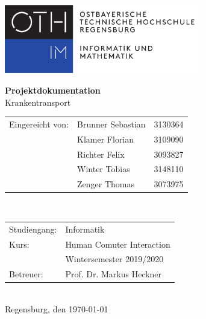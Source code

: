 \documentclass[a4paper, ngerman, 12pt]{scrartcl}
\begin{document}
\begin{titlepage}
\begin{center}
\begin{flushleft}
\includegraphics[height=30mm]{def/OTHR_FakIM_Logo}
\end{flushleft}
\vspace*{3cm}
{\Huge\textbf{Projektdokumentation}}\\
\vspace{1cm}
{\huge Krankentransport}\\
\end{center}
\vspace{\fill}
\begin{normalsize}
\begin{tabular}{p{4cm}p{4cm}p{4cm}}
Eingereicht von:	&Brunner Sebastian		&3130364\\
				&Klamer Florian		&3109090\\
				&Richter Felix			&3093827\\
				&Winter Tobias			&3148110\\
				&Zenger Thomas		&3073975\\
\end{tabular}\\[0.5em]
\begin{tabular}{p{4cm}p{6cm}}
Studiengang:		&Informatik			\\[0.3em]
Kurs:				&Human Comuter Interaction	\\
				&Wintersemester 2019/2020	\\[0.3em]
Betreuer:			&Prof. Dr. Markus Heckner	\\
\end{tabular}\\[3em]
Regensburg, den \today
\end{normalsize}
\vspace{1cm}
\end{titlepage}


\pagestyle{fancy}
\tableofcontents
\newpage

\listoffigures
\newpage

\end{document}
